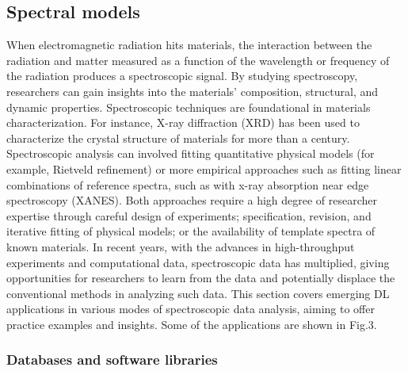 \documentclass[pdflatex,sn-mathphys]{sn-jnl}%
\theoremstyle{thmstyleone}%
\theoremstyle{thmstyletwo}%
\theoremstyle{thmstylethree}%
\begin{document}


\subsection{Spectral models}\label{sec:spectral}

When electromagnetic radiation hits materials, the interaction between the radiation and matter measured as a function of the wavelength or frequency of the radiation produces a spectroscopic signal. By studying spectroscopy, researchers can gain insights into the materials’ composition, structural, and dynamic properties. Spectroscopic techniques are foundational in materials characterization. For instance, X-ray diffraction (XRD) has been used to characterize the crystal structure of materials for more than a century.
Spectroscopic analysis can involved fitting quantitative physical models (for example, Rietveld refinement) or more empirical approaches such as fitting linear combinations of reference spectra, such as with x-ray absorption near edge spectroscopy (XANES). Both approaches require a high degree of researcher expertise through careful design of experiments; specification, revision, and iterative fitting of physical models; or the availability of template spectra of known materials. In recent years, with the advances in high-throughput experiments and computational data, spectroscopic data has multiplied, giving opportunities for researchers to learn from the data and potentially displace the conventional methods in analyzing such data. This section covers emerging DL applications in various modes of spectroscopic data analysis, aiming to offer practice examples and insights. Some of the applications are shown in Fig.3.


\subsubsection{Databases and software libraries}
\end{document}
